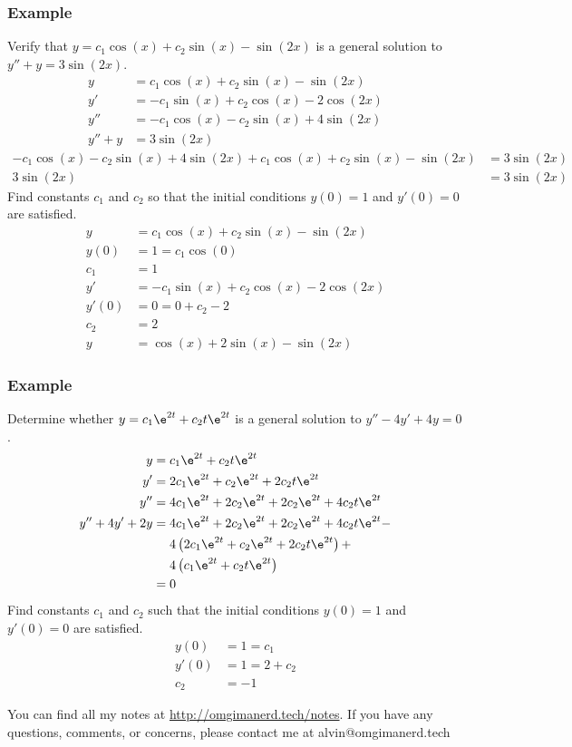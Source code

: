 \documentclass{math}
\begin{document}
\subsubsection*{Example}
Verify that \( y = c_1\cos(x)+c_2\sin(x)-\sin(2x) \) is a general solution to
\( y''+y = 3\sin(2x) \).
\begin{align*}
  y &= c_1\cos(x)+c_2\sin(x)-\sin(2x) \\
  y' &= -c_1\sin(x)+c_2\cos(x)-2\cos(2x) \\
  y'' &= -c_1\cos(x)-c_2\sin(x)+4\sin(2x) \\
  y''+y &= 3\sin(2x)
\end{align*}
\begin{align*}
  -c_1\cos(x)-c_2\sin(x)+4\sin(2x)+c_1\cos(x)+c_2\sin(x)-\sin(2x) &=
    3\sin(2x) \\
  3\sin(2x) &= 3\sin(2x)
\end{align*}
Find constants \( c_1 \) and \( c_2 \) so that the initial conditions
\( y(0) = 1 \) and \( y'(0) = 0 \) are satisfied.
\begin{align*}
  y &= c_1\cos(x)+c_2\sin(x)-\sin(2x) \\
  y(0) &= 1 = c_1\cos(0) \\
  c_1 &= 1 \\
  y' &= -c_1\sin(x)+c_2\cos(x)-2\cos(2x) \\
  y'(0) &= 0 = 0+c_2-2 \\
  c_2 &= 2 \\
  y &= \cos(x)+2\sin(x)-\sin(2x)
\end{align*}

\subsubsection*{Example}
Determine whether \( y = c_1\e^{2t}+c_2t\e^{2t} \) is a general solution to
\( y''-4y'+4y = 0 \).
\begin{align*}
  y &= c_1\e^{2t}+c_2t\e^{2t} \\
  y' &= 2c_1\e^{2t}+c_2\e^{2t}+2c_2t\e^{2t} \\
  y'' &= 4c_1\e^{2t}+2c_2\e^{2t}+2c_2\e^{2t}+4c_2t\e^{2t} \\
  y''+4y'+2y &= 4c_1\e^{2t}+2c_2\e^{2t}+2c_2\e^{2t}+4c_2t\e^{2t}- \\
    &~~~~ 4\left(2c_1\e^{2t}+c_2\e^{2t}+2c_2t\e^{2t}\right)+ \\
    &~~~~ 4\left(c_1\e^{2t}+c_2t\e^{2t}\right) \\
  &= 0
\end{align*}
Find constants \( c_1 \) and \( c_2 \) such that the initial conditions
\( y(0) = 1 \) and \( y'(0) = 0 \) are satisfied.
\begin{align*}
  y(0) &= 1 = c_1 \\
  y'(0) &= 1 = 2+c_2 \\
  c_2 &= -1
\end{align*}

\begin{center}
  You can find all my notes at \url{http://omgimanerd.tech/notes}. If you have
  any questions, comments, or concerns, please contact me at
  alvin@omgimanerd.tech
\end{center}
\end{document}
